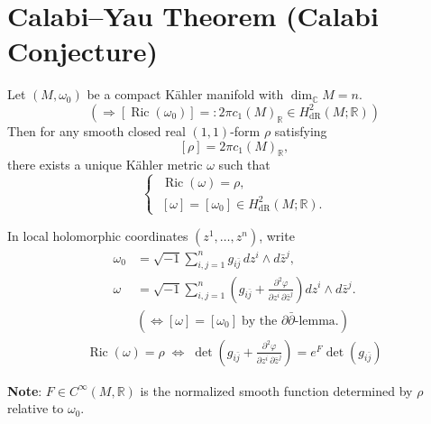 \documentclass[11pt]{article}
\begin{document}
\section*{Calabi--Yau Theorem (Calabi Conjecture)}

\begin{theorem}
Let $(M,\omega_0)$ be a compact K\"ahler manifold with $\dim_{\mathbb C} M=n$.
\[
\left(\Rightarrow[\operatorname{Ric}(\omega_0)]
=:2\pi c_1(M)_{\mathbb R}
\in H_{\mathrm{dR}}^2(M;\mathbb R)\right)
\]
Then for any smooth closed real $(1,1)$-form $\rho$ satisfying
\[
[\rho]=2\pi c_1(M)_{\mathbb R},
\]
there exists a unique K\"ahler metric $\omega$ such that
\[
\begin{cases}
\;\operatorname{Ric}(\omega)=\rho,\\
\;[\omega]=[\omega_0]\in H_{\mathrm{dR}}^2(M;\mathbb R).
\end{cases}
\]
\end{theorem}

\begin{tcolorbox}[
  namedstatement,
  title={Local-Coordinate Formulation}
]
In local holomorphic coordinates $(z^1,\ldots,z^n)$, write
\[
\begin{aligned}
\omega_0
&=\sqrt{-1}\sum_{i,j=1}^{n}
g_{i\bar j}\,dz^i\wedge d\bar z^j,\\[6pt]
\omega
&=\sqrt{-1}\sum_{i,j=1}^{n}
\left(
g_{i\bar j}
+\frac{\partial^2\varphi}
{\partial z^i\,\partial\bar z^j}
\right)
dz^i\wedge d\bar z^j.\\[6pt]
&(\Longleftrightarrow
[\omega]=[\omega_0]
\;\text{by the }\partial\bar\partial\text{-lemma.})
\end{aligned}
\]
\[
\begin{gathered}
\operatorname{Ric}(\omega)=\rho
\;\Longleftrightarrow\;
\det\left(
g_{i\bar j}
+\frac{\partial^2\varphi}
{\partial z^i\,\partial\bar z^j}
\right)
=\boxed{e^F\det\left(g_{i\bar j}\right)}
\end{gathered}
\]

\textbf{Note}: \(F\in C^\infty(M,\mathbb R)\) is the normalized
smooth function determined by \(\rho\) relative to \(\omega_0\).

\end{tcolorbox}
\end{document}
